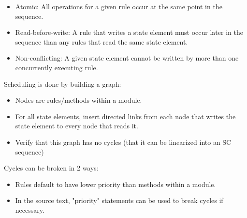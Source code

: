 \begin{itemize}
\item Atomic: All operations for a given rule occur at the same point in the sequence.
\item Read-before-write:  A rule that writes a state element must occur later in the sequence
than any rules that read the same state element.
\item Non-conflicting: A given state element cannot be written by more than one concurrently executing rule.
\end{itemize}

Scheduling is done by building a graph:
\begin{itemize}
\item Nodes are rules/methods within a module.
\item For all state elements, insert directed links from each node that writes the state element to every node that reads it.
\item Verify that this graph has no cycles (that it can be linearized into an SC sequence)
\end{itemize}

Cycles can be broken in 2 ways:
\begin{itemize}
\item Rules default to have lower priority than methods within a module.
\item In the source text, "priority" statements can be used to break cycles if necessary.
\end{itemize}

